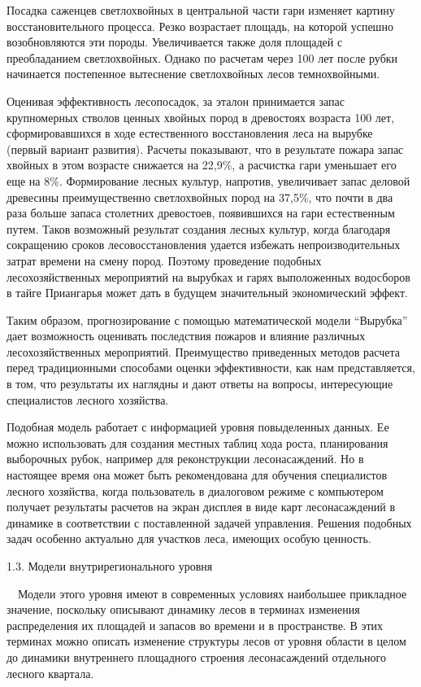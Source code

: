 \documentclass{report}
\begin{document}
Посадка саженцев светлохвойных в центральной части гари изменяет картину восстановительного процесса. Резко возрастает
площадь, на которой успешно возобновляются эти породы. Увеличивается также доля площадей с преобладанием светлохвойных.
Однако по расчетам через 100 лет после рубки начинается постепенное вытеснение светлохвойных лесов темнохвойными.

Оценивая эффективность лесопосадок, за эталон принимается за\-пас крупномерных стволов ценных хвойных пород в древостоях
возраста 100 лет, сформировавшихся в ходе естественного восста\-новления леса на вырубке (первый вариант развития).
Расчеты показывают, что в результате пожара запас хвойных в этом воз\-расте снижается на 22,9\%, а расчистка гари
уменьшает его еще на 8\%. Формирование лесных культур, напротив, увеличивает запас деловой древесины преимущественно
светлохвойных пород на 37,5\%, что почти в два раза больше запаса столетних древостоев, появившихся на гари
естественным путем. Таков возможный результат создания лесных культур, когда благодаря сокращению сроков
лесовосстановления удается избежать непроизводительных затрат времени на смену пород. Поэтому проведение подобных
лесохозяйственных мероприятий на вырубках и гарях выположенных водосборов в тайге Приангарья может дать в будущем
значительный экономический эффект.

Таким образом, прогнозирование с помощью математической модели “Вырубка” дает возможность оценивать последствия
по\-жаров и влияние различных лесохозяйственных мероприятий. Преимущество приведенных методов расчета перед
традиционны\-ми способами оценки эффективности, как нам представляется, в том, что результаты их наглядны и дают ответы
на вопросы, интересующие специалистов лесного хозяйства. 

Подобная модель работает с информацией уровня повыделенных данных. Ее можно использовать для создания местных таблиц
хода роста, планирования выборочных рубок, например для реконструкции лесонасаждений. Но в настоящее время она может
быть рекомендована для обучения специалистов лесного хозяйства, когда пользователь в диалоговом режиме с компьютером
получает  результаты расчетов на экран дисплея в виде карт лесонасаждений в динамике в соответствии с поставленной
задачей управления. Решения подобных задач особенно актуально для участков леса, имеющих особую ценность.  

1.3. Модели внутрирегионального уровня

\ \ Модели этого уровня имеют в современных условиях наибольшее прикладное значение, поскольку описывают динамику лесов
в терминах изменения распределения их площадей и запасов во времени и в пространстве.  В этих терминах можно описать
изменение структуры лесов от уровня области в целом до динамики внутреннего площадного  строения лесонасаждений
отдельного лесного квартала. 
\end{document}
